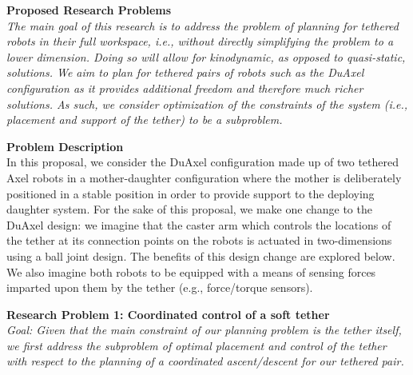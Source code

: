 \documentclass[12pt]{article}
\begin{document}
{\bf Proposed Research Problems \\}
{\sl The main goal of this research is to address the problem of planning for tethered robots in their 
full workspace, i.e., without directly simplifying the problem to a lower dimension. Doing so will allow 
for kinodynamic, as opposed to quasi-static, solutions. We aim to plan for tethered pairs of robots 
such as the DuAxel configuration as it provides additional freedom and therefore much richer solutions. 
As such, we consider optimization of the constraints of the system (i.e., placement and support of the tether) 
to be a subproblem.}

{\bf Problem Description \\}
In this proposal, we consider the DuAxel configuration made up of two tethered Axel robots in a mother-daughter
configuration where the mother is deliberately positioned in a stable position in order to provide support 
to the deploying daughter system. For the sake of this proposal, we make one change to the DuAxel design: 
we imagine that the caster arm which controls the locations of the tether at its connection points on the robots
is actuated in two-dimensions using a ball joint design. The benefits of this design change are explored below. 
We also imagine both robots to be equipped with a means of sensing forces imparted upon them by the tether 
(e.g., force/torque sensors).

{\bf Research Problem 1: Coordinated control of a soft tether \\}
{\sl Goal: Given that the main constraint of our planning problem is the tether itself, we first 
address the subproblem of optimal placement and control of the tether with respect to the planning of 
a coordinated ascent/descent for our tethered pair. }
\end{document}
